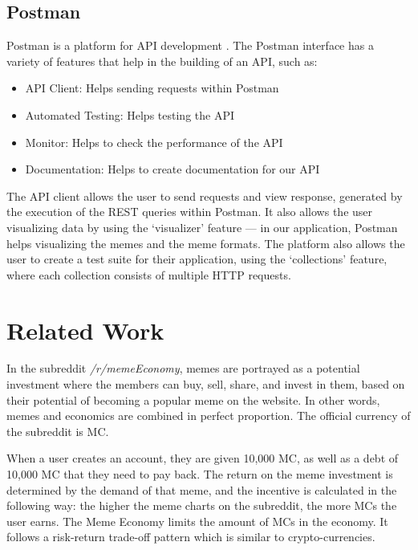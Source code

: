 \documentclass[12pt]{article}
\begin{document}
\subsection{Postman}
Postman is a platform for \ac{API} development \cite{Postman}. The Postman interface has a variety of features that help in the building of an \ac{API}, such as:
\begin{itemize}
    \item API Client: Helps sending requests within Postman
    \item Automated Testing: Helps testing the API
    \item Monitor: Helps to check the performance of the API
    \item Documentation: Helps to create documentation for our API
\end{itemize}

The \ac{API} client allows the user to send requests and view response, generated by the execution of the REST queries within Postman. It also allows the user visualizing data by using the `visualizer' feature --- in our application, Postman helps visualizing the memes and the meme formats. The platform also allows the user to create a test suite for their application, using the `collections' feature, where each collection consists of multiple HTTP requests.


\section{Related Work} \label{sec:Related Work}%
In the subreddit \textit{/r/memeEconomy}, memes are portrayed as a potential investment where the members can buy, sell, share, and invest in them, based on their potential of becoming a popular meme on the website. In other words, memes and economics are combined in perfect proportion. The official currency of the subreddit is \ac{MC}.

When a user creates an account, they are given 10,000 \ac{MC}, as well as a debt of 10,000 \ac{MC} that they need to pay back. The return on the meme investment is determined by the demand of that meme, and the incentive is calculated in the following way: the higher the meme charts on the subreddit, the more \acp{MC} the user earns. The Meme Economy limits the amount of \acp{MC} in the economy. It follows a risk-return trade-off pattern which is similar to crypto-currencies.
\end{document}
